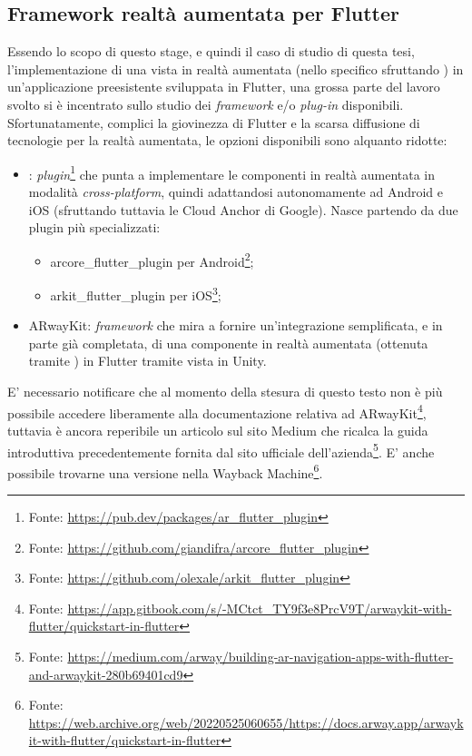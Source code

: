 \subsection{Framework realtà aumentata per Flutter}
Essendo lo scopo di questo stage, e quindi il caso di studio di questa tesi, l'implementazione di una vista in realtà aumentata (nello specifico sfruttando \asa{}) in un'applicazione preesistente sviluppata in Flutter, una grossa parte del lavoro svolto si è incentrato sullo studio dei \textit{framework} e/o \textit{plug-in} disponibili.\\
Sfortunatamente, complici la giovinezza di Flutter e la scarsa diffusione di tecnologie per la realtà aumentata, le opzioni disponibili sono alquanto ridotte:
\begin{itemize}
    \item \aplug{}: \textit{plugin}\footnote{Fonte: \url{https://pub.dev/packages/ar_flutter_plugin}} che punta a implementare le componenti in realtà aumentata in modalità \textit{cross-platform}, quindi adattandosi autonomamente ad Android e iOS (sfruttando tuttavia le Cloud Anchor di Google). Nasce partendo da due plugin più specializzati: 
    \begin{itemize}
        \item arcore\_flutter\_plugin per Android\footnote{Fonte: \url{https://github.com/giandifra/arcore_flutter_plugin}};
        \item arkit\_flutter\_plugin per iOS\footnote{Fonte: \url{https://github.com/olexale/arkit_flutter_plugin}};
    \end{itemize}
    \item ARwayKit: \textit{framework} che mira a fornire un'integrazione semplificata, e in parte già completata, di una componente in realtà aumentata (ottenuta tramite \asa{}) in Flutter tramite vista in Unity.
\end{itemize}
E' necessario notificare che al momento della stesura di questo testo non è più possibile accedere liberamente alla documentazione relativa ad ARwayKit\footnote{Fonte: \url{https://app.gitbook.com/s/-MCtct_TY9f3e8PrcV9T/arwaykit-with-flutter/quickstart-in-flutter}}, tuttavia è ancora reperibile un articolo sul sito Medium che ricalca la guida introduttiva precedentemente fornita dal sito ufficiale dell'azienda\footnote{Fonte: \url{https://medium.com/arway/building-ar-navigation-apps-with-flutter-and-arwaykit-280b69401cd9}}. 
E' anche possibile trovarne una versione nella Wayback Machine\footnote{Fonte: \url{https://web.archive.org/web/20220525060655/https://docs.arway.app/arwaykit-with-flutter/quickstart-in-flutter}}.

